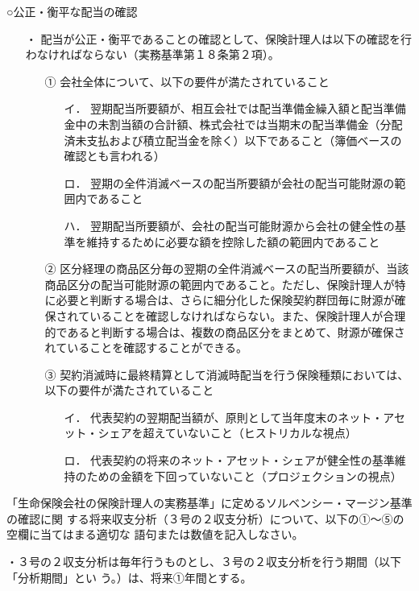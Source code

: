\documentclass[report,gutter=10mm,fore-edge=10mm,uplatex,dvipdfmx]{jlreq}
\begin{document}
○公正・衡平な配当の確認
\begin{itemize}
\item[・]配当が公正・衡平であることの確認として、保険計理人は以下の確認を行わなければならない（実務基準第１８条第２項）。
\begin{itemize}
\item[①]会社全体について、以下の要件が満たされていること
\begin{itemize}
\item[イ． ] 翌期配当所要額が、相互会社では配当準備金繰入額と配当準備金中の未割当額の合計額、株式会社では当期末の配当準備金（分配済未支払および積立配当金を除く）以下であること（簿価ベースの確認とも言われる）
\item[ロ． ] 翌期の全件消滅ベースの配当所要額が会社の配当可能財源の範囲内であること
\item[ハ． ] 翌期配当所要額が、会社の配当可能財源から会社の健全性の基準を維持するために必要な額を控除した額の範囲内であること
\end{itemize}
\item[②] 区分経理の商品区分毎の翌期の全件消滅ベースの配当所要額が、当該商品区分の配当可能財源の範囲内であること。ただし、保険計理人が特に必要と判断する場合は、さらに細分化した保険契約群団毎に財源が確保されていることを確認しなければならない。また、保険計理人が合理的であると判断する場合は、複数の商品区分をまとめて、財源が確保されていることを確認することができる。
\item[③] 契約消滅時に最終精算として消滅時配当を行う保険種類においては、以下の要件が満たされていること
\begin{itemize}
\item[イ．] 代表契約の翌期配当額が、原則として当年度末のネット・アセット・シェアを超えていないこと（ヒストリカルな視点）
\item[ロ．] 代表契約の将来のネット・アセット・シェアが健全性の基準維持のための金額を下回っていないこと（プロジェクションの視点）
\end{itemize}
\end{itemize}
\end{itemize}


「生命保険会社の保険計理人の実務基準」に定めるソルベンシー・マージン基準の確認に関
する将来収支分析（３号の２収支分析）について、以下の①～⑤の空欄に当てはまる適切な
語句または数値を記入しなさい。

・３号の２収支分析は毎年行うものとし、３号の２収支分析を行う期間（以下「分析期間」とい
う。）は、将来①年間とする。
\end{document}
